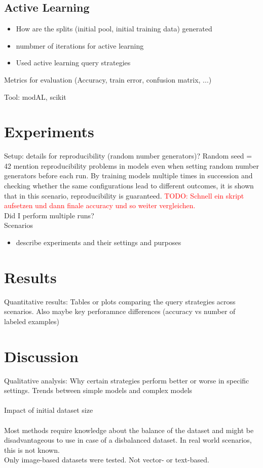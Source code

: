 \documentclass{article}
\theoremstyle{plain}
\theoremstyle{definition}
\theoremstyle{remark}
\begin{document}
\subsection{Active Learning}
\begin{itemize}
	\item How are the splits (initial pool, initial training data) generated
	\item numbmer of iterations for active learning
	\item Used active learning query strategies
\end{itemize}

Metrics for evaluation (Accuracy, train error, confusion matrix, ...)

Tool: modAL, scikit

\section{Experiments}\label{sec:experiments}
Setup: details for reproducibility (random number generators)?
Random seed = 42
\cite{comparableactivelearning} mention reproducibility problems in models even when setting random number generators before each run. By training models multiple times in succession and checking whether the same configurations lead to different outcomes, it is shown that in this scenario, reproducibility is guaranteed. \textcolor{red}{TODO: Schnell ein skript aufsetzen und dann finale accuracy und so weiter vergleichen.}
\\
Did I perform multiple runs?
\\

Scenarios
\begin{itemize}
	\item describe experiments and their settings and purposes
\end{itemize}

\section{Results}\label{sec:results}
Quantitative results: Tables or plots comparing the query strategies across scenarios. Also maybe key perforamnce differences (accuracy vs number of labeled examples)

\section{Discussion}\label{sec:discussion}
Qualitative analysis: Why certain strategies perform better or worse in specific settings. Trends between simple models and complex models
\\
\\
Impact of initial dataset size
\\
\\
Most methods require knowledge about the balance of the dataset and might be disadvantageous to use in case of a disbalanced dataset. In real world scenarios, this is not known. \\
Only image-based datasets were tested. Not vector- or text-based. 
\end{document}
